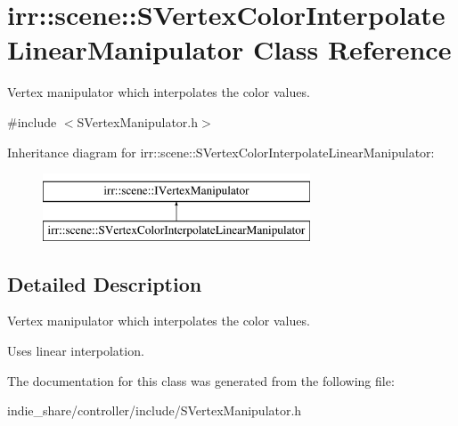\hypertarget{classirr_1_1scene_1_1SVertexColorInterpolateLinearManipulator}{}\section{irr\+:\+:scene\+:\+:S\+Vertex\+Color\+Interpolate\+Linear\+Manipulator Class Reference}
\label{classirr_1_1scene_1_1SVertexColorInterpolateLinearManipulator}


Vertex manipulator which interpolates the color values.  




{\ttfamily \#include $<$S\+Vertex\+Manipulator.\+h$>$}

Inheritance diagram for irr\+:\+:scene\+:\+:S\+Vertex\+Color\+Interpolate\+Linear\+Manipulator\+:\begin{figure}[H]
\begin{center}
\leavevmode
\includegraphics[height=2.000000cm]{classirr_1_1scene_1_1SVertexColorInterpolateLinearManipulator}
\end{center}
\end{figure}


\subsection{Detailed Description}
Vertex manipulator which interpolates the color values. 

Uses linear interpolation. 

The documentation for this class was generated from the following file\+:\begin{DoxyCompactItemize}
\item 
indie\+\_\+share/controller/include/S\+Vertex\+Manipulator.\+h\end{DoxyCompactItemize}
